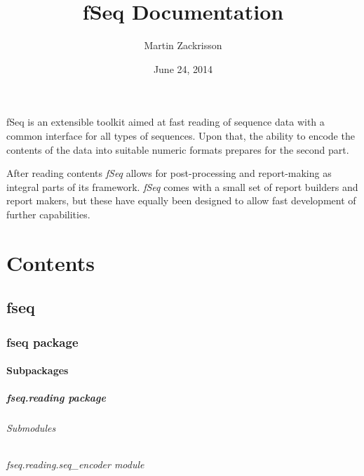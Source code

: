 \documentclass[letterpaper,10pt,english]{sphinxmanual}
\title{fSeq Documentation}
\date{June 24, 2014}
\author{Martin Zackrisson}
\begin{document}
\maketitle
\tableofcontents
{}\label{index::doc}


fSeq is an extensible toolkit aimed at fast reading of sequence data with a
common interface for all types of sequences.
Upon that, the ability to encode the contents of the data into suitable numeric
formats prepares for the second part.

After reading contents \emph{fSeq} allows for post-processing and report-making as
integral parts of its framework.
\emph{fSeq} comes with a small set of report builders and report makers, but these
have equally been designed to allow fast development of further capabilities.


\chapter{Contents}
\label{index:welcome-to-fseq}\label{index:contents}

\section{fseq}
\label{modules::doc}\label{modules:fseq}

\subsection{fseq package}
\label{fseq:fseq-package}\label{fseq::doc}

\subsubsection{Subpackages}
\label{fseq:subpackages}

\paragraph{fseq.reading package}
\label{fseq.reading:fseq-reading-package}\label{fseq.reading::doc}

\subparagraph{Submodules}
\label{fseq.reading:submodules}

\subparagraph{fseq.reading.seq\_encoder module}
\label{fseq.reading:module-fseq.reading.seq_encoder}\label{fseq.reading:fseq-reading-seq-encoder-module}
\end{document}
